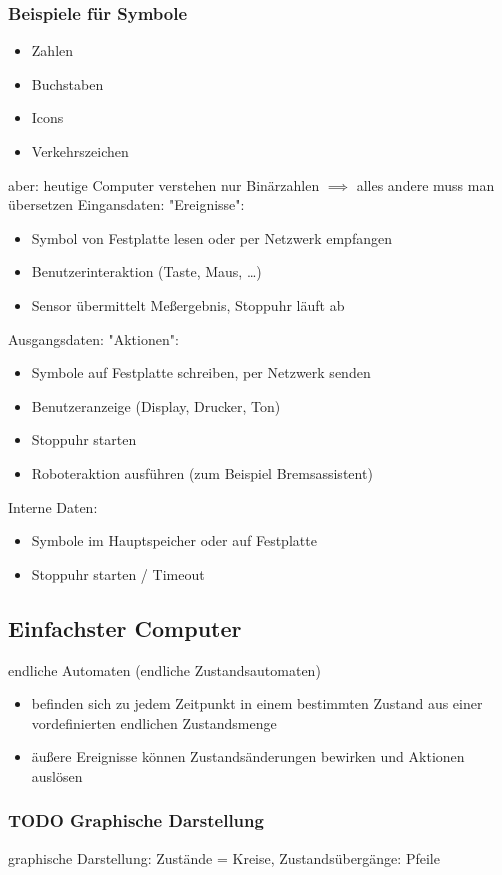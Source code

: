 \documentclass[a4paper]{scrartcl}
\begin{document}
\subsubsection{Beispiele für Symbole}
\label{sec-3-2-1}
\begin{itemize}
\item Zahlen
\item Buchstaben
\item Icons
\item Verkehrszeichen
\end{itemize}
aber: heutige Computer verstehen nur Binärzahlen $\implies$ alles andere muss man übersetzen
Eingansdaten: "Ereignisse":
\begin{itemize}
\item Symbol von Festplatte lesen oder per Netzwerk empfangen
\item Benutzerinteraktion (Taste, Maus, \ldots{})
\item Sensor übermittelt Meßergebnis, Stoppuhr läuft ab
\end{itemize}
Ausgangsdaten: "Aktionen":
\begin{itemize}
\item Symbole auf Festplatte schreiben, per Netzwerk senden
\item Benutzeranzeige (Display, Drucker, Ton)
\item Stoppuhr starten
\item Roboteraktion ausführen (zum Beispiel Bremsassistent)
\end{itemize}
Interne Daten:
\begin{itemize}
\item Symbole im Hauptspeicher oder auf Festplatte
\item Stoppuhr starten / Timeout
\end{itemize}
\subsection{Einfachster Computer}
\label{sec-3-3}
endliche Automaten (endliche Zustandsautomaten)
\begin{itemize}
\item befinden sich zu jedem Zeitpunkt in einem bestimmten Zustand aus einer vordefinierten endlichen Zustandsmenge
\item äußere Ereignisse können Zustandsänderungen bewirken und Aktionen auslösen
\end{itemize}
\subsubsection{{\bfseries\sffamily TODO} Graphische Darstellung}
\label{sec-3-3-1}
graphische Darstellung: Zustände = Kreise, Zustandsübergänge: Pfeile
\end{document}
